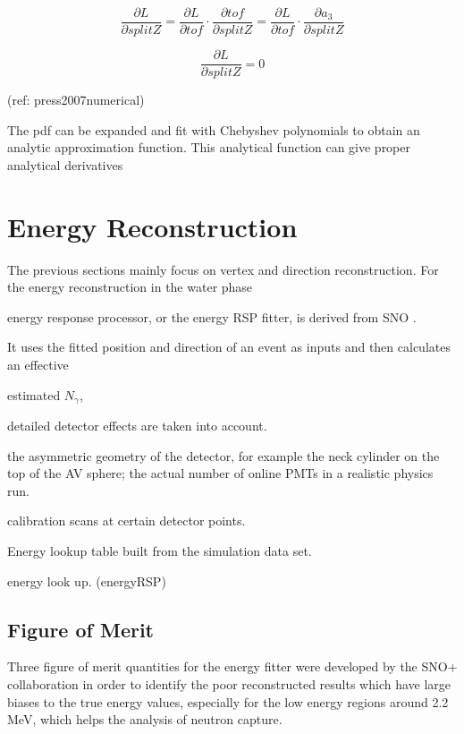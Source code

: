 \[
\frac{\partial L}{\partial splitZ} = \frac{\partial L}{\partial tof}\cdot\frac{\partial tof}{\partial splitZ}=\frac{\partial L}{\partial tof}\cdot\frac{\partial a_3}{\partial splitZ}
\]


\[
\frac{\partial L}{\partial splitZ} = 0
\]


(ref: press2007numerical)


The pdf can be expanded and fit with Chebyshev polynomials to obtain an analytic approximation function\cite{press2007numerical}. This analytical function can give proper analytical derivatives




\section{Energy Reconstruction}
 
The previous sections mainly focus on vertex and direction reconstruction. For the energy reconstruction in the water phase 

energy response processor, or the energy RSP fitter, is derived from SNO \cite{boulay2004direct,moffat2001optical}.

It uses the fitted position and direction of an event as inputs and then calculates an effective 

estimated $N_\gamma$,

detailed detector effects are taken into account.

the asymmetric geometry of the detector, for example the neck cylinder on the top of the AV sphere; the actual number of online PMTs in a realistic physics run.

 calibration scans at certain detector points.

Energy lookup table built from the simulation data set.

energy look up\cite{energyRSP}.
(energyRSP)

\subsection{Figure of Merit}\label{sect:energy_fom}
Three figure of merit quantities for the energy fitter were developed by the SNO+ collaboration in order to identify the poor reconstructed results which have large biases to the true energy values, especially for the low energy regions around 2.2 MeV, which helps the analysis of neutron capture\cite{waterunidoc}.

